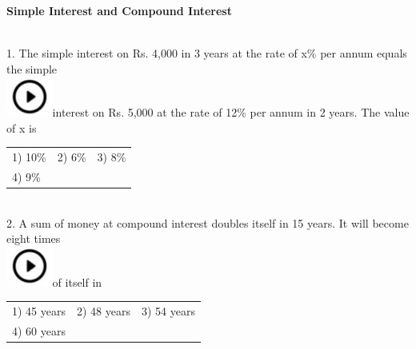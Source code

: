 \documentclass{article}
\begin{document}
	
	
	\noindent \begin{center}
		{\large \textbf{Simple Interest and Compound Interest \\}}
	\end{center}
	
	\noindent 
	
	\noindent 
	
	\noindent 
	
	\noindent 
	
	\noindent 
	
	
	\noindent \\ 
	
	1.   The simple interest on Rs. 4,000 in 3 years at the rate of x\% per annum equals the simple  
	\noindent \\ \includegraphics*[width=0.60in, height=0.52in]{images/image1}interest on Rs. 5,000 at the rate of 12\% per annum in 2 years. The value of x is
	
	\noindent \begin{tabular}{p{1.7in} p{1.6in} p{1.6in}} \\ 
 1) 10\%                    & 2) 6\%                & 3) 8\%                \\
4) 9\% \\
\end{tabular}
	
	\noindent  \\ 
	
	2.   A sum of money at compound interest doubles itself in 15 years. It will become eight times  
	\noindent \\ \includegraphics*[width=0.60in, height=0.52in]{images/image1}of itself in
	
	\noindent \begin{tabular}{p{1.7in} p{1.6in} p{1.6in}} \\ 
 1) 45 years             & 2) 48 years       & 3) 54 years       \\
4) 60 years \\
\end{tabular}
	
\end{document}
